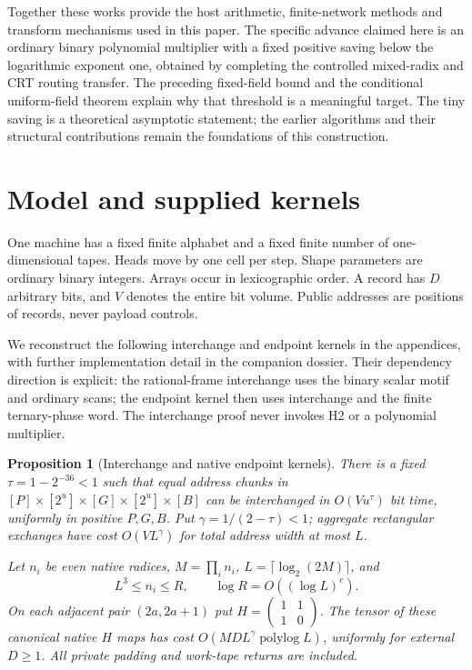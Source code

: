 \documentclass[11pt]{article}
\newtheorem{proposition}[theorem]{Proposition}
\begin{document}
Together these works provide the host arithmetic, finite-network
methods and transform mechanisms used in this paper. The specific
advance claimed here is an ordinary binary polynomial multiplier
with a fixed positive saving below the logarithmic exponent one,
obtained by completing the controlled mixed-radix and CRT routing
transfer. The preceding fixed-field bound and the conditional
uniform-field theorem explain why that threshold is a meaningful
target. The tiny saving is a theoretical asymptotic statement;
the earlier algorithms and their structural contributions remain
the foundations of this construction.

\section{Model and supplied kernels}

One machine has a fixed finite alphabet and a fixed finite number of
one-dimensional tapes. Heads move by one cell per step. Shape parameters
are ordinary binary integers. Arrays occur in lexicographic order.
A record has $D$ arbitrary bits, and $V$ denotes the entire bit volume.
Public addresses are positions of records, never payload controls.

We reconstruct the following interchange and endpoint kernels in the
appendices, with further implementation detail in the companion dossier.
Their dependency direction is explicit: the rational-frame interchange
uses the binary scalar motif and ordinary scans; the endpoint kernel
then uses interchange and the finite ternary-phase word. The
interchange proof never invokes H2 or a polynomial multiplier.

\begin{proposition}[Interchange and native endpoint kernels]
\label{prop:suppliers}
There is a fixed $\tau=1-2^{-36}<1$ such that equal address chunks
in $[P]\times[2^u]\times[G]\times[2^u]\times[B]$ can be interchanged in
$O(Vu^\tau)$ bit time, uniformly in positive $P,G,B$.
Put $\gamma=1/(2-\tau)<1$; aggregate rectangular exchanges have cost
$O(VL^\gamma)$ for total address width at most $L$.

Let $n_i$ be even native radices, $M=\prod_i n_i$,
$L=\lceil\log_2(2M)\rceil$, and
\[
 L^3\le n_i\le R,\qquad \log R=O((\log L)^c).
\]
On each adjacent pair $(2a,2a+1)$ put
$H=\left(\begin{smallmatrix}1&1\\1&0\end{smallmatrix}\right)$.
The tensor of these canonical native $H$ maps has cost
$O(MD L^\gamma\operatorname{polylog}L)$, uniformly for external $D\ge1$.
All private padding and work-tape returns are included.
\end{proposition}
\end{document}
